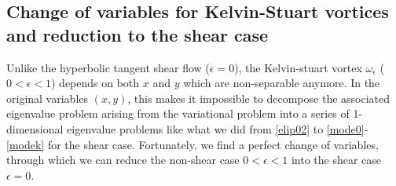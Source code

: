 \documentclass[1 [leqno, 11pt]{amsart}
\numberwithin{equation}{section}
\let\ep=\epsilon
\begin{document}
\begin{CJK*}{GBK}{song}
\subsection{Change of variables for  Kelvin-Stuart vortices  and reduction to the shear case}\label{Kelvin-stuart cats eyes flows}
Unlike the hyperbolic tangent shear flow ($\ep=0$), the Kelvin-stuart vortex  $\omega_\ep$ ($0 < \ep < 1$) depends on both $x$ and $y$ which are non-separable anymore.  In the original variables $(x,y)$, this makes it impossible to decompose the associated eigenvalue problem arising from the variational problem
 into a series of 1-dimensional eigenvalue problems  like what we did from \eqref{elip02} to \eqref{mode0}-\eqref{modek} for the shear case.
Fortunately, we  find a perfect change of variables, through which we can reduce the non-shear case  $0 < \ep < 1$ into the shear case  $\ep = 0$.


\end{CJK*}
\end{document}
